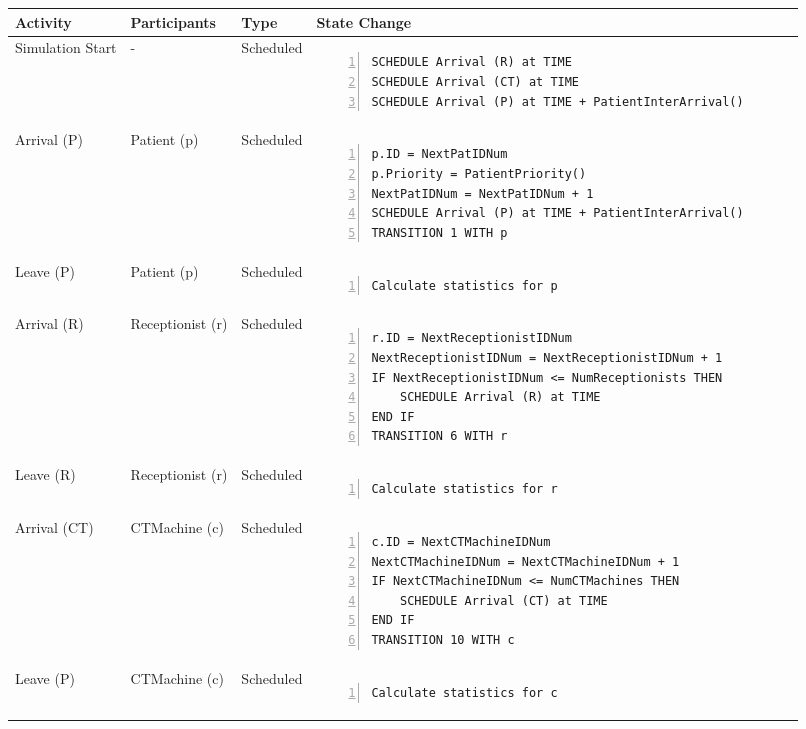 \begin{tabular}{@{}>{\raggedright\arraybackslash}p{1.5cm}>{\raggedright\arraybackslash}p{2.1cm}>{\raggedright\arraybackslash}p{2.2cm}>{\raggedright\arraybackslash}p{10cm}@{}}
  \toprule
  Activity          & Participants & Type       & State Change \\ \midrule
  Simulation Start & -  & Scheduled  & 
  \vspace{-12pt}
  \begin{Verbatim}[numbers=left]
SCHEDULE Arrival (R) at TIME
SCHEDULE Arrival (CT) at TIME
SCHEDULE Arrival (P) at TIME + PatientInterArrival()
  \end{Verbatim}
  \\ \midrule
  Arrival (P) & Patient (p)  & Scheduled  & 
  \vspace{-12pt}
  \begin{Verbatim}[numbers=left]
p.ID = NextPatIDNum
p.Priority = PatientPriority()
NextPatIDNum = NextPatIDNum + 1
SCHEDULE Arrival (P) at TIME + PatientInterArrival()
TRANSITION 1 WITH p
  \end{Verbatim}
  \\ \midrule
  Leave (P) & Patient (p)  & Scheduled  & 
  \vspace{-12pt}
  \begin{Verbatim}[numbers=left]
Calculate statistics for p
  \end{Verbatim}
  \\ \midrule
  Arrival (R) & Receptionist (r)  & Scheduled  & 
  \vspace{-12pt}
  \begin{Verbatim}[numbers=left]
r.ID = NextReceptionistIDNum
NextReceptionistIDNum = NextReceptionistIDNum + 1
IF NextReceptionistIDNum <= NumReceptionists THEN
    SCHEDULE Arrival (R) at TIME
END IF
TRANSITION 6 WITH r
  \end{Verbatim}
  \\ \midrule
  Leave (R) & Receptionist (r)  & Scheduled  & 
  \vspace{-12pt}
  \begin{Verbatim}[numbers=left]
Calculate statistics for r
  \end{Verbatim}
  \\ \midrule
  Arrival (CT) & CTMachine (c)  & Scheduled  & 
  \vspace{-12pt}
  \begin{Verbatim}[numbers=left]
c.ID = NextCTMachineIDNum
NextCTMachineIDNum = NextCTMachineIDNum + 1
IF NextCTMachineIDNum <= NumCTMachines THEN
    SCHEDULE Arrival (CT) at TIME
END IF
TRANSITION 10 WITH c
  \end{Verbatim}
  \\ \midrule
  Leave (P) & CTMachine (c)  & Scheduled  & 
  \vspace{-12pt}
  \begin{Verbatim}[numbers=left]
Calculate statistics for c
  \end{Verbatim}
  \\ \bottomrule
  \end{tabular}